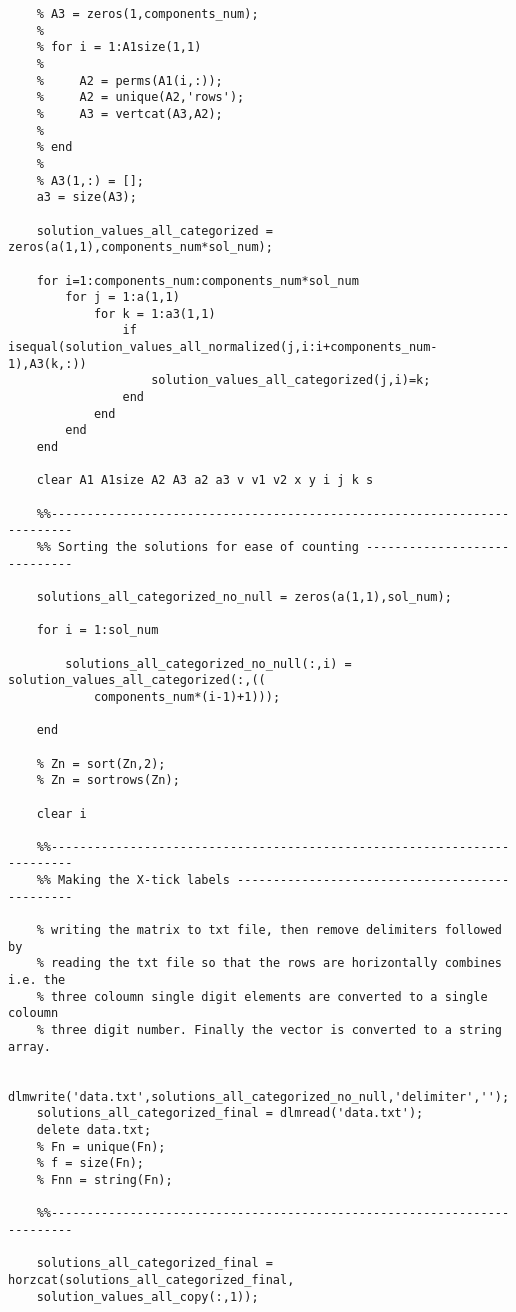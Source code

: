 \documentclass{article}
\begin{document}
\begin{verbatim}
    % A3 = zeros(1,components_num);
    % 
    % for i = 1:A1size(1,1)
    % 
    %     A2 = perms(A1(i,:));
    %     A2 = unique(A2,'rows');
    %     A3 = vertcat(A3,A2);
    % 
    % end
    % 
    % A3(1,:) = [];
    a3 = size(A3);
    
    solution_values_all_categorized = zeros(a(1,1),components_num*sol_num);
    
    for i=1:components_num:components_num*sol_num
        for j = 1:a(1,1)
            for k = 1:a3(1,1)
                if isequal(solution_values_all_normalized(j,i:i+components_num-1),A3(k,:))
                    solution_values_all_categorized(j,i)=k;
                end
            end
        end
    end
    
    clear A1 A1size A2 A3 a2 a3 v v1 v2 x y i j k s
    
    %%-------------------------------------------------------------------------
    %% Sorting the solutions for ease of counting -----------------------------
    
    solutions_all_categorized_no_null = zeros(a(1,1),sol_num);
    
    for i = 1:sol_num
    
        solutions_all_categorized_no_null(:,i) = solution_values_all_categorized(:,((
            components_num*(i-1)+1)));
    
    end
    
    % Zn = sort(Zn,2);
    % Zn = sortrows(Zn);
    
    clear i
    
    %%-------------------------------------------------------------------------
    %% Making the X-tick labels -----------------------------------------------
    
    % writing the matrix to txt file, then remove delimiters followed by
    % reading the txt file so that the rows are horizontally combines i.e. the
    % three coloumn single digit elements are converted to a single coloumn
    % three digit number. Finally the vector is converted to a string array.
    
    dlmwrite('data.txt',solutions_all_categorized_no_null,'delimiter','');
    solutions_all_categorized_final = dlmread('data.txt');
    delete data.txt;
    % Fn = unique(Fn);
    % f = size(Fn);
    % Fnn = string(Fn);
    
    %%-------------------------------------------------------------------------
    
    solutions_all_categorized_final = horzcat(solutions_all_categorized_final,
    solution_values_all_copy(:,1));
    

\end{verbatim}
\end{document}
